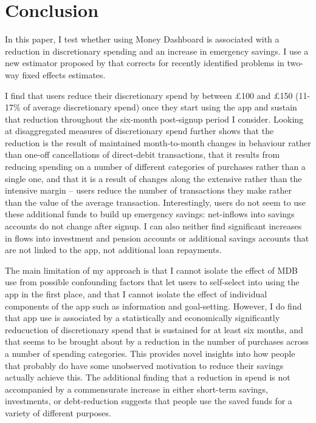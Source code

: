 
\section{Conclusion}
\label{sec:conclusion}

In this paper, I test whether using Money Dashboard is associated
with a reduction in discretionary spending and an increase in emergency
savings. I use a new estimator proposed by \citet{callaway2021difference}
that corrects for recently identified problems in two-way fixed effects
estimates.

I find that users reduce their discretionary spend by between \pounds100 and
\pounds150 (11-17\% of average discretionary spend) once they start using the
app and sustain that reduction throughout the six-month post-signup period I
consider. Looking at disaggregated measures of discretionary spend further
shows that the reduction is the result of maintained month-to-month changes in
behaviour rather than one-off cancellations of direct-debit transactions, that
it results from reducing spending on a number of different categories of
purchases rather than a single one, and that it is a result of changes along
the extensive rather than the intensive margin -- users reduce the number of
transactions they make rather than the value of the average transaction.
Interestingly, users do not seem to use these additional funds to build up
emergency savings: net-inflows into savings accounts do not change after
signup. I can also neither find significant increases in flows into investment
and pension accounts or additional savings accounts that are not linked to the
app, not additional loan repayments.

The main limitation of my approach is that I cannot isolate the effect of MDB
use from possible confounding factors that let users to self-select into using
the app in the first place, and that I cannot isolate the effect of individual
components of the app such as information and goal-setting. However, I do find
that app use is associated by a statistically and economically significantly
reducuction of discretionary spend that is sustained for at least six months,
and that seems to be brought about by a reduction in the number of purchases
across a number of spending categories. This provides novel insights into how
people that probably do have some unobserved motivation to reduce their savings
actually achieve this. The additional finding that a reduction in spend is not
accompanied by a commensurate increase in either short-term savings,
investments, or debt-reduction suggests that people use the saved funds for a
variety of different purposes.

